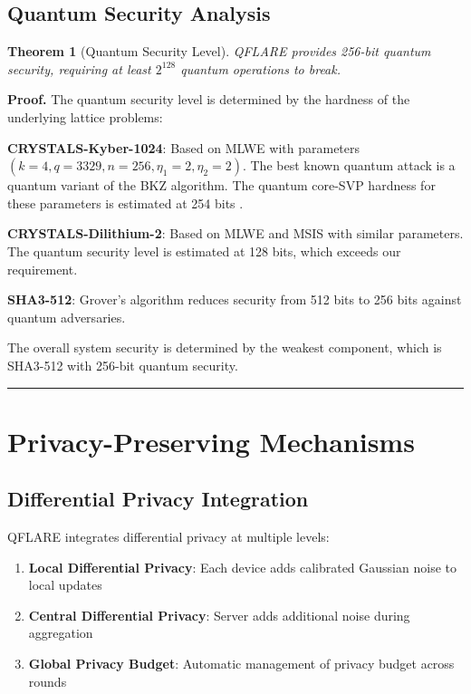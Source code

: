 \documentclass[journal,onecolumn]{IEEEtran}
\newtheorem{theorem}{Theorem}
\newenvironment{proof}[1][Proof]{\noindent\textbf{#1.} }{\ \rule{0.5em}{0.5em}}
\begin{document}
\subsection{Quantum Security Analysis}

\begin{theorem}[Quantum Security Level]
QFLARE provides 256-bit quantum security, requiring at least $2^{128}$ quantum operations to break.
\end{theorem}

\begin{proof}
The quantum security level is determined by the hardness of the underlying lattice problems:

\textbf{CRYSTALS-Kyber-1024}: Based on MLWE with parameters $(k=4, q=3329, n=256, \eta_1=2, \eta_2=2)$. The best known quantum attack is a quantum variant of the BKZ algorithm. The quantum core-SVP hardness for these parameters is estimated at 254 bits \cite{alkim2016post}.

\textbf{CRYSTALS-Dilithium-2}: Based on MLWE and MSIS with similar parameters. The quantum security level is estimated at 128 bits, which exceeds our requirement.

\textbf{SHA3-512}: Grover's algorithm reduces security from 512 bits to 256 bits against quantum adversaries.

The overall system security is determined by the weakest component, which is SHA3-512 with 256-bit quantum security.
\end{proof}

\section{Privacy-Preserving Mechanisms}

\subsection{Differential Privacy Integration}

QFLARE integrates differential privacy at multiple levels:

\begin{enumerate}
\item \textbf{Local Differential Privacy}: Each device adds calibrated Gaussian noise to local updates
\item \textbf{Central Differential Privacy}: Server adds additional noise during aggregation
\item \textbf{Global Privacy Budget}: Automatic management of privacy budget across rounds
\end{enumerate}
\end{document}
